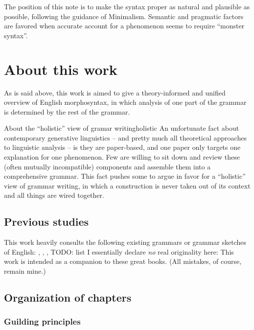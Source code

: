 \documentclass[UTF8, a4paper, oneside, scheme=plain]{ctexrep}
\begin{document}
The position of this note is to make the syntax proper as natural and plausible as possible,
following the guidance of Minimalism.
Semantic and pragmatic factors are favored 
when accurate account for a phenomenon seems to 
require ``monster syntax''.

\section{About this work}

As is said above,
this work is aimed to give a theory-informed and unified overview of English morphosyntax,
in which analysis of one part of the grammar is determined by the rest of the grammar.

\begin{infobox}{About the ``holistic'' view of gramar writing}{holistic}
    An unfortunate fact about contemporary generative linguistics -- 
    and pretty much all theoretical approaches to linguistic analysis -- 
    is they are paper-based,
    and one paper only targets one explanation for one phenomenon.
    Few are willing to sit down 
    and review these (often mutually incompatible) components 
    and assemble them into a comprehensive grammar. 
    This fact pushes some to argue in favor for a ``holistic'' view of grammar writing,
    in which a construction is never taken out of its context 
    and all things are wired together.
\end{infobox}

\subsection{Previous studies}

This work heavily consults the following existing grammars or grammar sketches of English:
\citet{cgel}, \citet{dixon2005semantic}, \citet{quirk1985}, TODO: list 
I essentially declare \emph{no} real originality here: 
This work is intended as a companion to these great books.
(All mistakes, of course, remain mine.)

\subsection{Organization of chapters}\label{sec:introduction.organization}

\subsubsection{Guilding principles}
\end{document}
